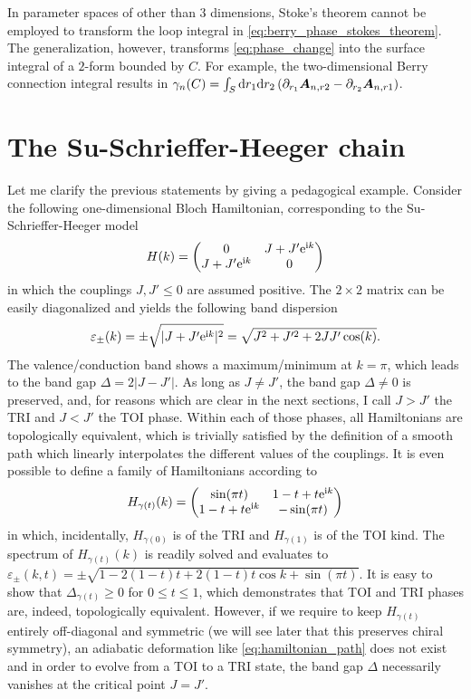 In parameter spaces of other than $3$ dimensions, Stoke's theorem cannot be employed to transform the loop integral in \cref{eq:berry_phase_stokes_theorem}.
The generalization, however, transforms \cref{eq:phase_change} into the surface integral of a $2$-form bounded by $C$.
For example, the two-dimensional Berry connection integral results in $\gamma_n(C) = \int_S\mathrm d r_1\mathrm d r_2 \left( \partial_{r_1}{\bm A}_{n,r2} - \partial_{r_2}{\bm A}_{n,r1} \right)$.
%
%
\section{The Su-Schrieffer-Heeger chain}
\label{sec:the_SSH_chain}
%
%
Let me clarify the previous statements by giving a pedagogical example.
Consider the following one-dimensional Bloch Hamiltonian, corresponding to the Su-Schrieffer-Heeger model~\cite{Heeger1988}
\begin{align}
    H(k)
    =
    \begin{pmatrix}
        0 & J+J'\mathrm e^{\mathrm i k}\\
        J+J'\mathrm e^{\mathrm i k} & 0
    \end{pmatrix}
\end{align}
in which the couplings $J,J'\leq0$ are assumed positive.
The $2\times2$ matrix can be easily diagonalized and yields the following band dispersion
\begin{align}
    \varepsilon_{\pm}(k) = \pm \sqrt{|J+J'\mathrm e^{\mathrm i k}|^2} = \sqrt{J^2+J'^2+2JJ'\cos(k)}.
\end{align}
The valence/conduction band shows a maximum/minimum at $k=\pi$, which leads to the band gap $\Delta = 2\left|J-J'\right|$.
As long as $J\neq J'$, the band gap $\Delta\neq0$ is preserved, and, for reasons which are clear in the next sections, I call $J>J'$ the TRI and $J<J'$ the TOI phase.
Within each of those phases, all Hamiltonians are topologically equivalent, which is trivially satisfied by the definition of a smooth path which linearly interpolates the different values of the couplings.
It is even possible to define a family of Hamiltonians according to
\begin{align}
    H_{\gamma(t)}(k) =
    \begin{pmatrix}
        \sin(\pi t) & 1-t + t\mathrm e^{\mathrm i k} \\
        1-t + t\mathrm e^{\mathrm i k} & -\sin(\pi t)
    \end{pmatrix}
    \label{eq:hamiltonian_path}
\end{align}
in which, incidentally, $H_{\gamma(0)}$ is of the TRI and $H_{\gamma(1)}$ is of the TOI kind.
The spectrum of $H_{\gamma(t)}(k)$ is readily solved and evaluates to $\varepsilon_\pm(k,t)=\pm\sqrt{1-2(1-t)t+2(1-t)t\cos k+\sin(\pi t)}$.
It is easy to show that $\Delta_{\gamma(t)}\geq0$ for $0\leq t\leq1$, which demonstrates that TOI and TRI phases are, indeed, topologically equivalent.
However, if we require to keep $H_{\gamma(t)}$ entirely off-diagonal and symmetric (we will see later that this preserves chiral symmetry), an adiabatic deformation like \cref{eq:hamiltonian_path} does not exist and in order to evolve from a TOI to a TRI state, the band gap $\Delta$ necessarily vanishes at the critical point $J=J'$.

